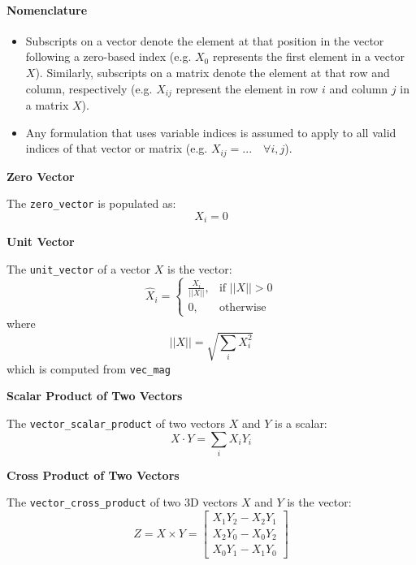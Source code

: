 \documentclass[11pt,fleqn]{report}
\begin{document}
\paragraph{Nomenclature}
\begin{itemize}
\item Subscripts on a vector denote the element at that position in the vector 
following a zero-based index (e.g. $X_0$ represents the first element in a 
vector $X$). Similarly, subscripts on a matrix denote the element at that row 
and column, respectively (e.g. $X_{ij}$ represent the element in row $i$ 
and column $j$ in a matrix $X$).
\item Any formulation that uses variable indices is assumed to apply to all valid
indices of that vector or matrix (e.g. $X_{ij} = ... \quad \forall i,j$).
\end{itemize}

\textbf{Zero Vector}

The \texttt{zero\_vector} is populated as:
\begin{equation*}
X_i = 0
\end{equation*}

\textbf{Unit Vector}

The \texttt{unit\_vector} of a vector $X$ is the vector:
\begin{equation*}
\hat{X}_i = 
\begin{cases}
\frac{X_i}{||X||}, & \text{if } ||X|| > 0 \\
0, & \text{otherwise}
\end{cases}
\end{equation*}
where
\begin{equation*}
||X||=\sqrt{\sum_i X_i^2}
\end{equation*}
which is computed from \texttt{vec\_mag}

\textbf{Scalar Product of Two Vectors}

The \texttt{vector\_scalar\_product} of two vectors $X$ and $Y$ is
a scalar:
\begin{equation*}
X \cdot Y = \sum_i X_i Y_i
\end{equation*}

\textbf{Cross Product of Two Vectors}

The \texttt{vector\_cross\_product} of two 3D vectors $X$ and $Y$ is
the vector:
\begin{equation*} 
Z = X \times Y = 
\begin{bmatrix} 
X_1 Y_2 - X_2 Y_1 \\
X_2 Y_0 - X_0 Y_2 \\
X_0 Y_1 - X_1 Y_0 
\end{bmatrix} 
\end{equation*}
\end{document}
